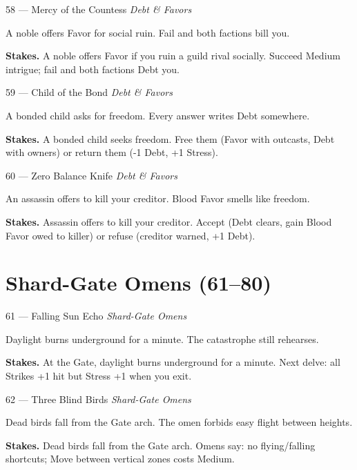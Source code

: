 \begin{encounterentry}{58 --- Mercy of the Countess}
\textit{Debt \& Favors}

A noble offers Favor for social ruin. Fail and both factions bill you.

\textbf{Stakes.} A noble offers Favor if you ruin a guild rival socially. Succeed Medium intrigue; fail and both factions Debt you.
\end{encounterentry}

\begin{encounterentry}{59 --- Child of the Bond}
\textit{Debt \& Favors}

A bonded child asks for freedom. Every answer writes Debt somewhere.

\textbf{Stakes.} A bonded child seeks freedom. Free them (Favor with outcasts, Debt with owners) or return them (-1 Debt, +1 Stress).
\end{encounterentry}

\begin{encounterentry}{60 --- Zero Balance Knife}
\textit{Debt \& Favors}

An assassin offers to kill your creditor. Blood Favor smells like freedom.

\textbf{Stakes.} Assassin offers to kill your creditor. Accept (Debt clears, gain Blood Favor owed to killer) or refuse (creditor warned, +1 Debt).
\end{encounterentry}

\section{Shard-Gate Omens (61--80)}

\begin{encounterentry}{61 --- Falling Sun Echo}
\textit{Shard-Gate Omens}

Daylight burns underground for a minute. The catastrophe still rehearses.

\textbf{Stakes.} At the Gate, daylight burns underground for a minute. Next delve: all Strikes +1 hit but Stress +1 when you exit.
\end{encounterentry}

\begin{encounterentry}{62 --- Three Blind Birds}
\textit{Shard-Gate Omens}

Dead birds fall from the Gate arch. The omen forbids easy flight between heights.

\textbf{Stakes.} Dead birds fall from the Gate arch. Omens say: no flying/falling shortcuts; Move between vertical zones costs Medium.
\end{encounterentry}

